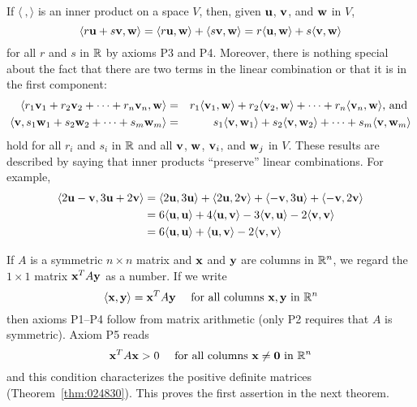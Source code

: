 If $\langle\ , \rangle$ is an inner product on a space $V$, then, given $\textbf{u}$, $\textbf{v}$, and $\textbf{w}$ in $V$,
\begin{equation*}
\langle r\textbf{u} + s\textbf{v}, \textbf{w} \rangle = \langle r\textbf{u}, \textbf{w} \rangle + \langle s\textbf{v}, \textbf{w} \rangle = r\langle \textbf{u}, \textbf{w} \rangle + s\langle \textbf{v}, \textbf{w} \rangle
\end{equation*}
for all $r$ and $s$ in $\mathbb{R}$ by axioms P3 and P4. Moreover, there is nothing special about the fact that there are two terms in the linear combination or that it is in the first component:
\begin{eqnarray*}
\langle r_1\textbf{v}_1 + r_2\textbf{v}_2 + \dots + r_n\textbf{v}_n, \textbf{w} \rangle &=& 
r_1\langle \textbf{v}_1, \textbf{w} \rangle + 
r_2\langle \textbf{v}_2, \textbf{w} \rangle + \dots +
r_n\langle \textbf{v}_n, \textbf{w} \rangle \mbox{, and }\\
\langle \textbf{v}, s_1\textbf{w}_1 + s_2\textbf{w}_2 + \dots + s_m\textbf{w}_m \rangle &=&
s_1\langle \textbf{v}, \textbf{w}_1 \rangle +
s_2\langle \textbf{v}, \textbf{w}_2 \rangle + \dots +
s_m\langle \textbf{v}, \textbf{w}_m \rangle
\end{eqnarray*}
hold for all $r_{i}$ and $s_{i}$ in $\mathbb{R}$ and all $\textbf{v}$, $\textbf{w}$, $\textbf{v}_{i}$, and $\textbf{w}_{j}$ in $V$. These results are described by saying that inner products ``preserve'' linear combinations. For example,
\begin{align*}
\langle 2\textbf{u} - \textbf{v}, 3\textbf{u} + 2\textbf{v} \rangle &= 
\langle 2\textbf{u}, 3\textbf{u} \rangle + \langle 2\textbf{u}, 2\textbf{v} \rangle + \langle -\textbf{v}, 3\textbf{u} \rangle + \langle -\textbf{v}, 2\textbf{v} \rangle \\
&= 6 \langle \textbf{u}, \textbf{u} \rangle + 4 \langle \textbf{u}, \textbf{v} \rangle -3 \langle \textbf{v}, \textbf{u} \rangle - 2 \langle \textbf{v}, \textbf{v} \rangle \\
&= 6 \langle \textbf{u}, \textbf{u} \rangle + \langle \textbf{u}, \textbf{v} \rangle - 2 \langle \textbf{v}, \textbf{v} \rangle 
\end{align*}

If $A$ is a symmetric $n \times n$ matrix and $\textbf{x}$ and $\textbf{y}$ are columns in $\mathbb{R}^n$, we regard the $1 \times 1$ matrix $\textbf{x}^{T}A\textbf{y}$ as a number. If we write
\begin{equation*}
\langle \textbf{x}, \textbf{y} \rangle = \textbf{x}^TA\textbf{y} \quad \mbox{ for all columns } \textbf{x}, \textbf{y} \mbox{ in } \mathbb{R}^n
\end{equation*}
then axioms P1--P4 follow from matrix arithmetic (only P2 requires that $A$ is symmetric). Axiom P5 reads
\begin{equation*}
\textbf{x}^TA \textbf{x} > 0 \quad \mbox{ for all columns } \textbf{x} \neq \textbf{0} \mbox{ in } \mathbb{R}^n
\end{equation*}
and this condition characterizes the positive definite matrices (Theorem~\ref{thm:024830}). This proves the first assertion in the next theorem.

